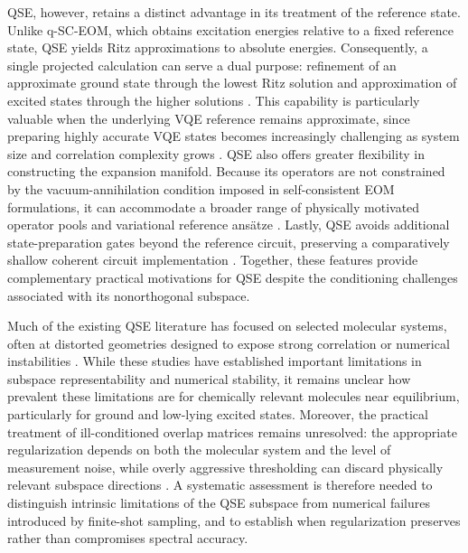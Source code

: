 QSE, however, retains a distinct advantage in its treatment of the reference state. Unlike q-SC-EOM, which obtains excitation energies relative to a fixed reference state, QSE yields Ritz approximations to absolute energies. 
Consequently, a single projected calculation can serve a dual purpose: refinement of an approximate ground state through the lowest Ritz solution and approximation of excited states through the higher solutions \cite{mcclean2017qse,yoshioka2022GeneralisedQSE}.
This capability is particularly valuable when the underlying VQE reference remains approximate, since preparing highly accurate VQE states becomes increasingly challenging as system size and correlation complexity grows \cite{Kumar2025VQEReview}.
QSE also offers greater flexibility in constructing the expansion manifold. 
Because its operators are not constrained by the vacuum-annihilation condition imposed in self-consistent EOM formulations, it can accommodate a broader range of physically motivated operator pools and variational reference ansätze \cite{mcclean2017qse, Kwao2026QSMGeneralisedEigenvalueProblem}. 
Lastly, QSE avoids additional state-preparation gates beyond the reference circuit, preserving a comparatively shallow coherent circuit implementation \cite{mcclean2017qse}. 
Together, these features provide complementary practical motivations for QSE despite the conditioning challenges associated with its nonorthogonal subspace.

Much of the existing QSE literature has focused on selected molecular systems, often at distorted geometries designed to expose strong correlation or numerical instabilities \cite{mcclean2017qse,Kwao2026QSMGeneralisedEigenvalueProblem, Liu2026CSQSE, Nakamura2024AdaptQSE}. 
While these studies have established important limitations in subspace representability and numerical stability, it remains unclear how prevalent these limitations are for chemically relevant molecules near equilibrium, particularly for ground and low-lying excited states. 
Moreover, the practical treatment of ill-conditioned overlap matrices remains unresolved: the appropriate regularization depends on both the molecular system and the level of measurement noise, while overly aggressive thresholding can discard physically relevant subspace directions \cite{Kwao2026QSMGeneralisedEigenvalueProblem}.
A systematic assessment is therefore needed to distinguish intrinsic limitations of the QSE subspace from numerical failures introduced by finite-shot sampling, and to establish when regularization preserves rather than compromises spectral accuracy.

